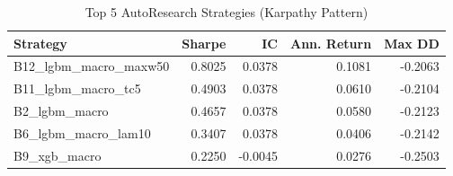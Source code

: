 \begin{table}
\caption{Top 5 AutoResearch Strategies (Karpathy Pattern)}
\label{tab:autoresearch_top5}
\begin{tabular}{lrrrr}
\toprule
Strategy & Sharpe & IC & Ann. Return & Max DD \\
\midrule
B12_lgbm_macro_maxw50 & 0.8025 & 0.0378 & 0.1081 & -0.2063 \\
B11_lgbm_macro_tc5 & 0.4903 & 0.0378 & 0.0610 & -0.2104 \\
B2_lgbm_macro & 0.4657 & 0.0378 & 0.0580 & -0.2123 \\
B6_lgbm_macro_lam10 & 0.3407 & 0.0378 & 0.0406 & -0.2142 \\
B9_xgb_macro & 0.2250 & -0.0045 & 0.0276 & -0.2503 \\
\bottomrule
\end{tabular}
\end{table}
